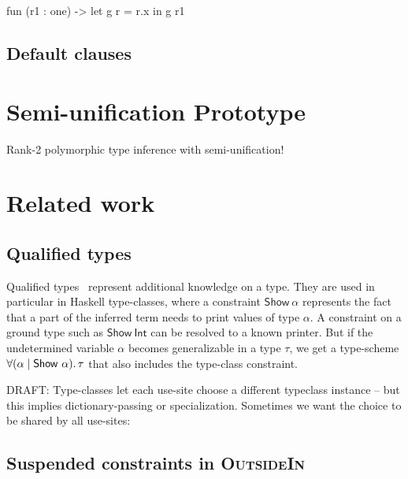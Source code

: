 \documentclass[acmsmall,screen,nonacm]{acmart}
\begin{document}
\begin{program}
fun (r1 : one) ->
  let g r = r.x in
  g r1
\end{program}


\subsection{Default clauses}


\section{Semi-unification Prototype}

Rank-2 polymorphic type inference with semi-unification!


\section{Related work}
\label{sec:related-work}

\subsection{Qualified types}


Qualified types~\citep*{TODO} represent additional knowledge on a type. They
are used in particular in Haskell type-classes, where a constraint
$\mathsf{Show}~\alpha$ represents the fact that a part of the inferred term
needs to print values of type $\alpha$. A constraint on a ground type such
as $\mathsf{Show}~\mathsf{Int}$ can be resolved to a known printer. But if
the undetermined variable $\alpha$ becomes generalizable in a type $\tau$,
we get a type-scheme $\forall {(\alpha \mid \mathsf{Show}~\alpha)}.\,{\tau}$ that
also includes the type-class constraint.

DRAFT: Type-classes let each use-site choose a different typeclass instance
-- but this implies dictionary-passing or specialization. Sometimes we want
the choice to be shared by all use-sites:


\subsection{Suspended constraints in \textsc{OutsideIn}}
\end{document}
